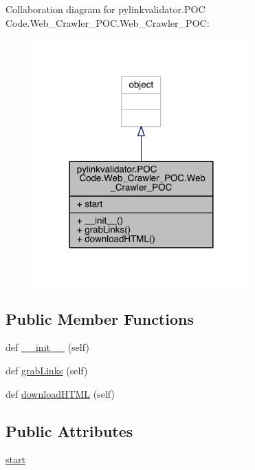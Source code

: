 Collaboration diagram for pylinkvalidator.\+P\+OC Code.\+Web\+\_\+\+Crawler\+\_\+\+P\+O\+C.\+Web\+\_\+\+Crawler\+\_\+\+P\+OC\+:
\nopagebreak
\begin{figure}[H]
\begin{center}
\leavevmode
\includegraphics[width=236pt]{classpylinkvalidator_1_1_p_o_c_01_code_1_1_web___crawler___p_o_c_1_1_web___crawler___p_o_c__coll__graph}
\end{center}
\end{figure}
\subsection*{Public Member Functions}
\begin{DoxyCompactItemize}
\item 
def \hyperlink{classpylinkvalidator_1_1_p_o_c_01_code_1_1_web___crawler___p_o_c_1_1_web___crawler___p_o_c_ada86ffcae767ad805e427f2a5ad9077b}{\+\_\+\+\_\+init\+\_\+\+\_\+} (self)
\item 
def \hyperlink{classpylinkvalidator_1_1_p_o_c_01_code_1_1_web___crawler___p_o_c_1_1_web___crawler___p_o_c_a11987d114e903e22f320ac3bb9929b4d}{grab\+Links} (self)
\item 
def \hyperlink{classpylinkvalidator_1_1_p_o_c_01_code_1_1_web___crawler___p_o_c_1_1_web___crawler___p_o_c_a0b963442829a18b9cf3ea81b8a97be0b}{download\+H\+T\+ML} (self)
\end{DoxyCompactItemize}
\subsection*{Public Attributes}
\begin{DoxyCompactItemize}
\item 
\hyperlink{classpylinkvalidator_1_1_p_o_c_01_code_1_1_web___crawler___p_o_c_1_1_web___crawler___p_o_c_a081769cb20d863382f36364a61c8060b}{start}
\end{DoxyCompactItemize}


